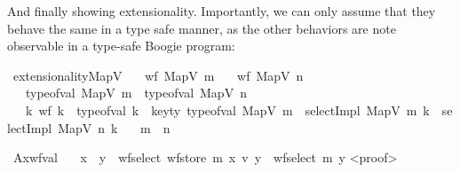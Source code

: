 \documentclass[11pt]{article}
\begin{document}
And finally showing extensionality.
Importantly, we can only assume that they behave the same in a type safe manner,
as the other behaviors are note observable in a type-safe Boogie program:
\begin{isabellebody}
\isamarkupfalse%
\ extensionalityMapV{\isacharcolon}{\kern0pt}\isanewline
\ \ \ {\isachardoublequoteopen}wf\ {\isacharparenleft}{\kern0pt}MapV\ m{\isacharparenright}{\kern0pt}{\isachardoublequoteclose}\isanewline
\ \ \ {\isachardoublequoteopen}wf\ {\isacharparenleft}{\kern0pt}MapV\ n{\isacharparenright}{\kern0pt}{\isachardoublequoteclose}\isanewline
\ \ \ {\isachardoublequoteopen}type{\isacharunderscore}{\kern0pt}of{\isacharunderscore}{\kern0pt}val\ {\isacharparenleft}{\kern0pt}MapV\ m{\isacharparenright}{\kern0pt}\ {\isacharequal}{\kern0pt}\ type{\isacharunderscore}{\kern0pt}of{\isacharunderscore}{\kern0pt}val\ {\isacharparenleft}{\kern0pt}MapV\ n{\isacharparenright}{\kern0pt}{\isachardoublequoteclose}\isanewline
\ \ \ {\isachardoublequoteopen}{\isasymforall}k{\isachardot}{\kern0pt}\ {\isacharparenleft}{\kern0pt}wf\ k\ {\isasymand}\ type{\isacharunderscore}{\kern0pt}of{\isacharunderscore}{\kern0pt}val\ k\ {\isacharequal}{\kern0pt}\ key{\isacharunderscore}{\kern0pt}ty\ {\isacharparenleft}{\kern0pt}type{\isacharunderscore}{\kern0pt}of{\isacharunderscore}{\kern0pt}val\ {\isacharparenleft}{\kern0pt}MapV\ m{\isacharparenright}{\kern0pt}{\isacharparenright}{\kern0pt}{\isacharparenright}{\kern0pt}\ {\isasymlongrightarrow}\ selectImpl\ {\isacharparenleft}{\kern0pt}MapV\ m{\isacharparenright}{\kern0pt}\ k\ {\isacharequal}{\kern0pt}\ selectImpl\ {\isacharparenleft}{\kern0pt}MapV\ n{\isacharparenright}{\kern0pt}\ k{\isachardoublequoteclose}\isanewline
\ \ \ {\isachardoublequoteopen}m\ {\isacharequal}{\kern0pt}\ n{\isachardoublequoteclose}\isanewline

\isamarkupfalse%
\ Ax{}{\isacharunderscore}{\kern0pt}wf{\isacharunderscore}{\kern0pt}val{\isacharcolon}{\kern0pt}\isanewline
\ \ \ {\isachardoublequoteopen}x\ {\isacharequal}{\kern0pt}\ y\ {\isasymor}\ wf{\isacharunderscore}{\kern0pt}select\ {\isacharparenleft}{\kern0pt}wf{\isacharunderscore}{\kern0pt}store\ m\ x\ v{\isacharparenright}{\kern0pt}\ y\ {\isacharequal}{\kern0pt}\ wf{\isacharunderscore}{\kern0pt}select\ m\ y{\isachardoublequoteclose}\isanewline
<proof>\isanewline
\end{isabellebody}
\end{document}
